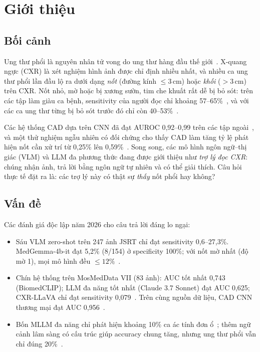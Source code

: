 \section{Giới thiệu}
\label{sec:intro}

\subsection{Bối cảnh}

Ung thư phổi là nguyên nhân tử vong do ung thư hàng đầu thế giới~\cite{bray2024globocan}. X-quang ngực
(CXR) là xét nghiệm hình ảnh được chỉ định nhiều nhất, và nhiều ca ung thư phổi lần đầu lộ ra dưới dạng
\emph{nốt} (đường kính $\le 3$\,cm) hoặc \emph{khối} ($> 3$\,cm) trên CXR. Nốt nhỏ, mờ hoặc bị xương sườn,
tim che khuất rất dễ bị bỏ sót: trên các tập làm giàu ca bệnh, sensitivity của người đọc chỉ khoảng
57--65\%~\cite{sim2020dcnn,ahn2022aiaided}, và với các ca ung thư từng bị bỏ sót trước đó chỉ còn
40--53\%~\cite{jang2020dlad}.

Các hệ thống CAD dựa trên CNN đã đạt AUROC 0,92--0,99 trên các tập ngoài~\cite{nam2019dlad}, và một thử
nghiệm ngẫu nhiên có đối chứng cho thấy CAD làm tăng tỷ lệ phát hiện nốt cần xử trí từ 0,25\% lên
0,59\%~\cite{nam2023rct}. Song song, các mô hình ngôn ngữ--thị giác (VLM) và LLM đa phương thức đang được
giới thiệu như \emph{trợ lý đọc CXR}: chúng nhận ảnh, trả lời bằng ngôn ngữ tự nhiên và có thể giải thích.
Câu hỏi thực tế đặt ra là: các trợ lý này có thật sự \emph{thấy} nốt phổi hay không?

\subsection{Vấn đề}

Các đánh giá độc lập năm 2026 cho câu trả lời đáng lo ngại:
\begin{itemize}
  \item Sáu VLM zero-shot trên 247 ảnh JSRT chỉ đạt sensitivity 0,6--27,3\%. MedGemma-4b-it đạt 5,2\%
        (8/154) ở specificity 100\%; với nốt mờ nhất (độ mờ 1), mọi mô hình đều $\le 12\%$~\cite{nishio2026zeroshot}.
  \item Chín hệ thống trên MosMedData VII (83 ảnh): AUC tốt nhất 0,743 (BiomedCLIP); LLM đa năng tốt nhất
        (Claude 3.7 Sonnet) đạt AUC 0,625; CXR-LLaVA chỉ đạt sensitivity 0,079~\cite{khovanova2026comparative}.
        Trên cùng nguồn dữ liệu, CAD CNN thương mại đạt AUC 0,956~\cite{arzamasov2024independent}.
  \item Bốn MLLM đa năng chỉ phát hiện khoảng 10\% ca ác tính đơn ổ~\cite{chen2026limitations}; thêm ngữ
        cảnh lâm sàng có cấu trúc giúp accuracy chung tăng, nhưng ung thư phổi vẫn chỉ đúng 20\%~\cite{cusick2026context}.
\end{itemize}

